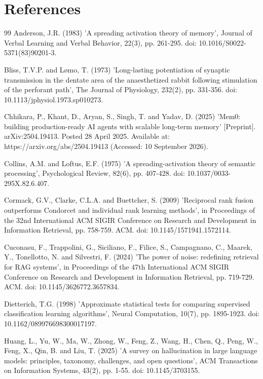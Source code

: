 \documentclass[10pt,a4paper,twocolumn]{article}
\begin{document}
\section*{References}
\begin{thebibliography}{99}
\setlength{\itemsep}{2pt}
Anderson, J.R. (1983) 'A spreading activation theory of memory', Journal of Verbal Learning and Verbal Behavior, 22(3), pp. 261-295. doi: 10.1016/S0022-5371(83)90201-3.

Bliss, T.V.P. and Lømo, T. (1973) 'Long-lasting potentiation of synaptic transmission in the dentate area of the anaesthetized rabbit following stimulation of the perforant path', The Journal of Physiology, 232(2), pp. 331-356. doi: 10.1113/jphysiol.1973.sp010273.

Chhikara, P., Khant, D., Aryan, S., Singh, T. and Yadav, D. (2025) 'Mem0: building production-ready AI agents with scalable long-term memory' [Preprint]. arXiv:2504.19413. Posted 28 April 2025. Available at: https://arxiv.org/abs/2504.19413 (Accessed: 10 September 2026).

Collins, A.M. and Loftus, E.F. (1975) 'A spreading-activation theory of semantic processing', Psychological Review, 82(6), pp. 407-428. doi: 10.1037/0033-295X.82.6.407.

Cormack, G.V., Clarke, C.L.A. and Buettcher, S. (2009) 'Reciprocal rank fusion outperforms Condorcet and individual rank learning methods', in Proceedings of the 32nd International ACM SIGIR Conference on Research and Development in Information Retrieval, pp. 758-759. ACM. doi: 10.1145/1571941.1572114.

Cuconasu, F., Trappolini, G., Siciliano, F., Filice, S., Campagnano, C., Maarek, Y., Tonellotto, N. and Silvestri, F. (2024) 'The power of noise: redefining retrieval for RAG systems', in Proceedings of the 47th International ACM SIGIR Conference on Research and Development in Information Retrieval, pp. 719-729. ACM. doi: 10.1145/3626772.3657834.

Dietterich, T.G. (1998) 'Approximate statistical tests for comparing supervised classification learning algorithms', Neural Computation, 10(7), pp. 1895-1923. doi: 10.1162/089976698300017197.

Huang, L., Yu, W., Ma, W., Zhong, W., Feng, Z., Wang, H., Chen, Q., Peng, W., Feng, X., Qin, B. and Liu, T. (2025) 'A survey on hallucination in large language models: principles, taxonomy, challenges, and open questions', ACM Transactions on Information Systems, 43(2), pp. 1-55. doi: 10.1145/3703155.


\end{thebibliography}
\end{document}
